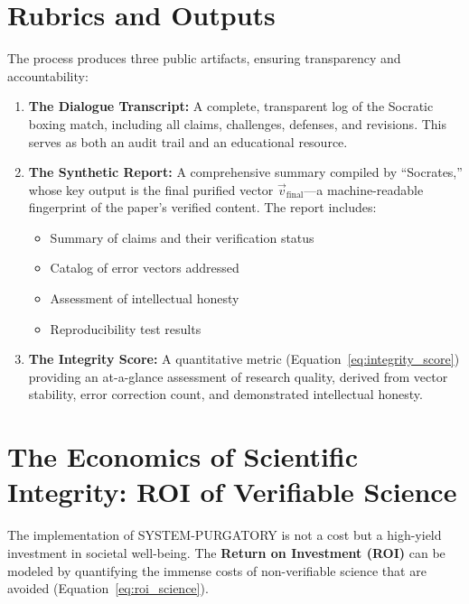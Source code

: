 \documentclass[11pt,a4paper]{article}
\begin{document}
\section{Rubrics and Outputs}
The process produces three public artifacts, ensuring transparency and accountability:

\begin{enumerate}
    \item \textbf{The Dialogue Transcript:} A complete, transparent log of the Socratic boxing match, including all claims, challenges, defenses, and revisions. This serves as both an audit trail and an educational resource.
    
    \item \textbf{The Synthetic Report:} A comprehensive summary compiled by ``Socrates,'' whose key output is the final purified vector $\vec{v}_{\text{final}}$—a machine-readable fingerprint of the paper's verified content. The report includes:
    \begin{itemize}[nosep]
        \item Summary of claims and their verification status
        \item Catalog of error vectors addressed
        \item Assessment of intellectual honesty
        \item Reproducibility test results
    \end{itemize}
    
    \item \textbf{The Integrity Score:} A quantitative metric (Equation~\eqref{eq:integrity_score}) providing an at-a-glance assessment of research quality, derived from vector stability, error correction count, and demonstrated intellectual honesty.
\end{enumerate}

\section{The Economics of Scientific Integrity: ROI of Verifiable Science}
The implementation of SYSTEM-PURGATORY is not a cost but a high-yield investment in societal well-being. The \textbf{Return on Investment (ROI)} can be modeled by quantifying the immense costs of non-verifiable science that are avoided (Equation~\eqref{eq:roi_science}).
\end{document}
